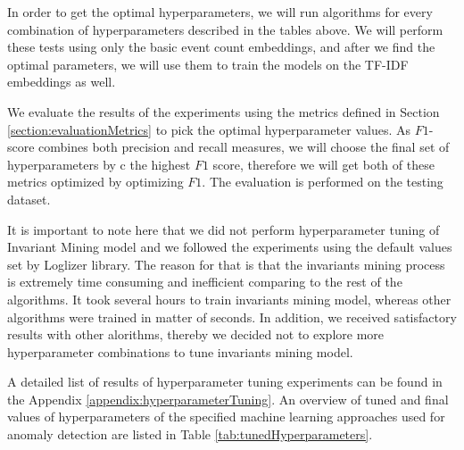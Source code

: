 
In order to get the optimal hyperparameters, we will run algorithms for every combination of hyperparameters described in the tables above. We will perform these tests using only the basic event count embeddings, and after we find the optimal parameters, we will use them to train the models on the TF-IDF embeddings as well. 

We evaluate the results of the experiments using the metrics defined in Section \ref{section:evaluationMetrics} to pick the optimal hyperparameter values. As $F1$-score combines both precision and recall measures, we will choose the final set of hyperparameters by c the highest $F1$ score, therefore we will get both of these metrics optimized by optimizing $F1$. The evaluation is performed on the testing dataset. 

It is important to note here that we did not perform hyperparameter tuning of Invariant Mining model and we followed the experiments using the default values set by Loglizer library. The reason for that is that the invariants mining process is extremely time consuming and inefficient comparing to the rest of the algorithms. It took several hours to train invariants mining model, whereas other algorithms were trained in matter of seconds. In addition, we received satisfactory results with other alorithms, thereby we decided not to explore more hyperparameter combinations to tune invariants mining model. 

A detailed list of results of hyperparameter tuning experiments can be found in the Appendix \ref{appendix:hyperparameterTuning}. An overview of tuned and final values of hyperparameters of the specified machine learning approaches used for anomaly detection are listed in Table \ref{tab:tunedHyperparameters}. 

